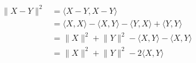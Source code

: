 \documentclass[preview]{standalone}
\begin{document}
\begin{align*}
\lVert X-Y \rVert ^{2}& = \langle X-Y , X-Y \rangle \\ & = \langle X , X \rangle - \langle X , Y \rangle - \langle Y , X \rangle + \langle Y , Y \rangle \\ & = \lVert X \rVert ^{2} + \lVert Y \rVert ^{2} - \langle X , Y \rangle - \langle X , Y \rangle \\ & = \lVert X \rVert ^{2} + \lVert Y \rVert ^{2} - 2 \langle X , Y \rangle
\end{align*}
\end{document}
